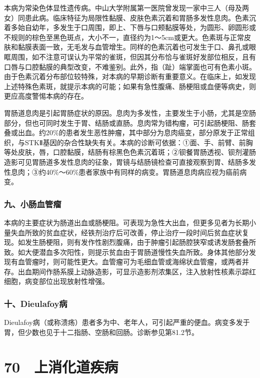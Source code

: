 本病为常染色体显性遗传病。中山大学附属第一医院曾发现一家中三人（母及两女）同患此病。临床特征为局限性黏膜、皮肤色素沉着和胃肠多发性息肉。色素沉着多始自幼年，多发生于口周围，即上、下唇与口颊黏膜等处，为圆形、卵圆形或不规则的棕色至黑色斑点，大小不一，直径约为1～5cm或更大。色素斑与正常皮肤和黏膜表面一致，无毛发与血管增生。同样的色素沉着也可发生于口、鼻孔或眼眶周围，如不注意可误认为平常的雀斑，但因其分布恰与雀斑好发部位相反，且有口唇与口腔黏膜的典型改变，不难鉴别。此外，指（趾）端掌面也可有色素小斑。由于色素沉着分布部位较特殊，对本病的早期诊断有重要意义。在临床上，如发现上述特殊色素斑，就提示本病的可能；如果有急性腹痛、肠梗阻或血便等病史，则更应高度警惕本病的存在。

胃肠道息肉是引起胃肠症状的原因。息肉为多发性，主要发生于小肠，尤其是空肠部分，但也可同时发生于胃、结肠或直肠。息肉常为错构瘤，可引起肠梗阻、肠套叠或出血。约20\%的患者发生恶性肿瘤，其中部分为息肉癌变，部分原发于正常组织，与STKⅡ基因的杂合性缺失有关。本病的诊断可依据：①面、手、前臂、前胸等处皮肤，唇，口腔黏膜，结肠有棕黑色色素沉着斑；②钡餐胃肠透视、钡剂灌肠造影可见胃肠道多发性息肉的征象，胃镜与结肠镜检查可直接观察到胃、结肠多发性息肉；③约40\%～60\%患者家族中有同样的病变。胃肠道息肉病应视为癌前病变。

\subsubsection{九、小肠血管瘤}

本病的主要症状为肠道出血或肠梗阻。可表现为急性大出血，但更多见者为长期小量失血所致的贫血症状，经铁剂治疗后可改善，停止治疗一段时间后贫血症状复现。如发生肠梗阻，则有发作性剧烈腹痛，由于肿瘤引起肠腔狭窄或诱发肠套叠所致。如大便潜血多次阳性，则提示贫血由于胃肠道慢性失血所致。身体其他部分发现有血管瘤时，则可能性更大。血管瘤可为毛细血管或海绵状血管瘤，或两者并存。出血期间作肠系膜上动脉造影，可显示造影剂浓集区，注入放射性核素示踪红细胞，病变部位出现放射性增强。

\subsubsection{十、Dieulafoy病}

Dieulafoy病（或称溃疡）患者多为中、老年人，可引起严重的便血。病变多发于胃，但少数也见于十二指肠、空肠和回肠。诊断参见第81.2节。

\protect\hypertarget{text00178.html}{}{}

\section{70　上消化道疾病}

